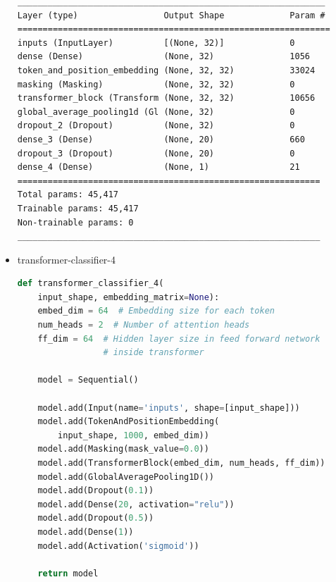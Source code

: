 \documentclass{article}
\begin{document}
\begin{itemize}
\begin{lstlisting}[numbers=none, caption=Обобщение на transformer-classifier-3.]
_____________________________________________________________
Layer (type)                 Output Shape             Param #
==============================================================
inputs (InputLayer)          [(None, 32)]             0
dense (Dense)                (None, 32)               1056
token_and_position_embedding (None, 32, 32)           33024
masking (Masking)            (None, 32, 32)           0
transformer_block (Transform (None, 32, 32)           10656
global_average_pooling1d (Gl (None, 32)               0
dropout_2 (Dropout)          (None, 32)               0
dense_3 (Dense)              (None, 20)               660
dropout_3 (Dropout)          (None, 20)               0
dense_4 (Dense)              (None, 1)                21
============================================================
Total params: 45,417
Trainable params: 45,417
Non-trainable params: 0
____________________________________________________________
\end{lstlisting}

  \item transformer-classifier-4

\begin{lstlisting}[language=Python, caption=Дефиниция на transformer-classifier-4.]
def transformer_classifier_4(
    input_shape, embedding_matrix=None):
    embed_dim = 64  # Embedding size for each token
    num_heads = 2  # Number of attention heads
    ff_dim = 64  # Hidden layer size in feed forward network
                 # inside transformer

    model = Sequential()

    model.add(Input(name='inputs', shape=[input_shape]))
    model.add(TokenAndPositionEmbedding(
        input_shape, 1000, embed_dim))
    model.add(Masking(mask_value=0.0))
    model.add(TransformerBlock(embed_dim, num_heads, ff_dim))
    model.add(GlobalAveragePooling1D())
    model.add(Dropout(0.1))
    model.add(Dense(20, activation="relu"))
    model.add(Dropout(0.5))
    model.add(Dense(1))
    model.add(Activation('sigmoid'))

    return model
\end{lstlisting}


\end{itemize}
\end{document}
